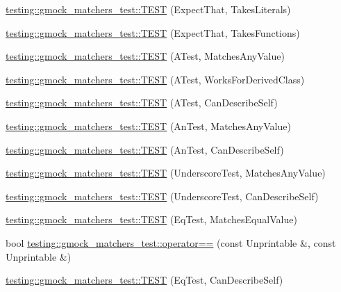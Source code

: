 \begin{DoxyCompactItemize}
\item 
\hyperlink{namespacetesting_1_1gmock__matchers__test_a7672c72f955b937542acd87d18dd7ea6}{testing\+::gmock\+\_\+matchers\+\_\+test\+::\+T\+E\+ST} (Expect\+That, Takes\+Literals)
\item 
\hyperlink{namespacetesting_1_1gmock__matchers__test_aafaf5273bd3d8ba273a5dd243d3a52ba}{testing\+::gmock\+\_\+matchers\+\_\+test\+::\+T\+E\+ST} (Expect\+That, Takes\+Functions)
\item 
\hyperlink{namespacetesting_1_1gmock__matchers__test_af15da53cdc65283b8ca688a03801fd12}{testing\+::gmock\+\_\+matchers\+\_\+test\+::\+T\+E\+ST} (A\+Test, Matches\+Any\+Value)
\item 
\hyperlink{namespacetesting_1_1gmock__matchers__test_a2b2dfb85d18883b07f7d13d21abee2fc}{testing\+::gmock\+\_\+matchers\+\_\+test\+::\+T\+E\+ST} (A\+Test, Works\+For\+Derived\+Class)
\item 
\hyperlink{namespacetesting_1_1gmock__matchers__test_a24432bc861bee430fb8ac1a4e5463ecf}{testing\+::gmock\+\_\+matchers\+\_\+test\+::\+T\+E\+ST} (A\+Test, Can\+Describe\+Self)
\item 
\hyperlink{namespacetesting_1_1gmock__matchers__test_a15bf6771986d1e9f675f29861f7551c1}{testing\+::gmock\+\_\+matchers\+\_\+test\+::\+T\+E\+ST} (An\+Test, Matches\+Any\+Value)
\item 
\hyperlink{namespacetesting_1_1gmock__matchers__test_ac3b18688ca5b5cf2d6137ce3e7397691}{testing\+::gmock\+\_\+matchers\+\_\+test\+::\+T\+E\+ST} (An\+Test, Can\+Describe\+Self)
\item 
\hyperlink{namespacetesting_1_1gmock__matchers__test_a3fc77fa5ca709ef70963026fd7114552}{testing\+::gmock\+\_\+matchers\+\_\+test\+::\+T\+E\+ST} (Underscore\+Test, Matches\+Any\+Value)
\item 
\hyperlink{namespacetesting_1_1gmock__matchers__test_a25ae831c15c9ca918ed847ba147ac572}{testing\+::gmock\+\_\+matchers\+\_\+test\+::\+T\+E\+ST} (Underscore\+Test, Can\+Describe\+Self)
\item 
\hyperlink{namespacetesting_1_1gmock__matchers__test_a2ac5d4c2fae3e7f2e6c6be657a61f86a}{testing\+::gmock\+\_\+matchers\+\_\+test\+::\+T\+E\+ST} (Eq\+Test, Matches\+Equal\+Value)
\item 
bool \hyperlink{namespacetesting_1_1gmock__matchers__test_a4b9f261a3b98ba0e0bca21b69d593241}{testing\+::gmock\+\_\+matchers\+\_\+test\+::operator==} (const Unprintable \&, const Unprintable \&)
\item 
\hyperlink{namespacetesting_1_1gmock__matchers__test_a1c86e845cb44f34eeac4863041c871c6}{testing\+::gmock\+\_\+matchers\+\_\+test\+::\+T\+E\+ST} (Eq\+Test, Can\+Describe\+Self)

\end{DoxyCompactItemize}
